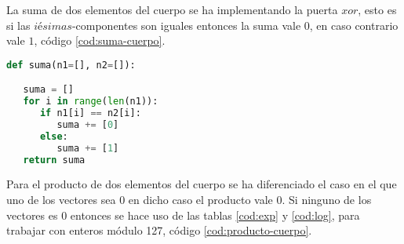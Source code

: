 La suma de dos elementos del cuerpo se ha implementando la puerta $xor$, esto es si las $iésimas$-componentes son iguales entonces la suma vale $0$, en caso contrario vale $1$, código \ref{cod:suma-cuerpo}.

\begin{table}[h]
	\label{tab:rel}
	\begin{center}
	\centering
	\end{center}
	\caption{Parámetros de la función \texttt{suma}}
\end{table}

\vspace{0.25cm}
\begin{lstlisting}[language=Python,caption=Suma de dos elementos del cuerpo, label=cod:suma-cuerpo]
def suma(n1=[], n2=[]):

   suma = []
   for i in range(len(n1)):
      if n1[i] == n2[i]:
         suma += [0]
      else:
         suma += [1]
   return suma
\end{lstlisting}

Para el producto de dos elementos del cuerpo se ha diferenciado el caso en el que uno de los vectores sea $0$ en dicho caso el producto vale 0. Si ninguno de los vectores es $0$ entonces se hace uso de las tablas \ref{cod:exp} y \ref{cod:log}, para trabajar con enteros módulo 127, código \ref{cod:producto-cuerpo}.

